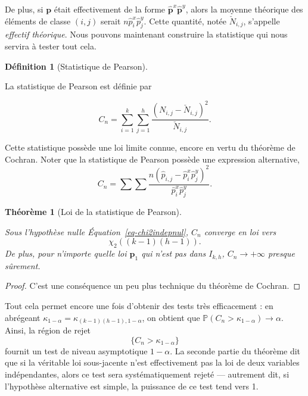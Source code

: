 \documentclass[
  10,
  letterpaper,
  DIV=11,
  numbers=noendperiod]{scrreport}
\theoremstyle{plain}
\newtheorem{theorem}{Théorème}[chapter]
\theoremstyle{definition}
\theoremstyle{plain}
\theoremstyle{definition}
\newtheorem{definition}{Définition}[chapter]
\theoremstyle{definition}
\theoremstyle{plain}
\theoremstyle{remark}
\begin{document}
De plus, si \(\mathbf{p}\) était effectivement de la forme
\(\hat{\mathbf{p}}^x\hat{\mathbf{p}}^y\), alors la moyenne théorique des
éléments de classe \((i,j)\) serait \(n\hat{p}^x_i \hat{p}^y_j\). Cette
quantité, notée \(\check{N}_{i,j}\), s'appelle \emph{effectif
théorique}. Nous pouvons maintenant construire la statistique qui nous
servira à tester tout cela.

\begin{definition}[Statistique de
Pearson]\protect\hypertarget{def-statpearson}{}\label{def-statpearson}

La statistique de Pearson est définie par

\[C_n = \sum_{i=1}^k \sum_{j=1}^h \frac{(N_{i,j} - \check{N}_{i,j})^2}{\check{N}_{i,j}}. \]

\end{definition}

Cette statistique possède une loi limite connue, encore en vertu du
théorème de Cochran. Noter que la statistique de Pearson possède une
expression alternative,
\[C_n = \sum\sum \frac{n(\hat{p}_{i,j} - \hat{p}^x_i \hat{p}^y_j)^2}{\hat{p}^x_i \hat{p}^y_j}.  \]

\begin{theorem}[Loi de la statistique de
Pearson]\protect\hypertarget{thm-testindepchi2}{}\label{thm-testindepchi2}

Sous l'hypothèse nulle Équation~\ref{eq-chi2indepnul}, \(C_n\) converge
en loi vers \[ \chi_2((k-1)(h-1)).\] De plus, pour n'importe quelle loi
\(\mathbf{p}_1\) qui n'est pas dans \(I_{k,h}\), \(C_n \to +\infty\)
presque sûrement.

\end{theorem}

\begin{proof}

C'est une conséquence un peu plus technique du théorème de Cochran.

\end{proof}

Tout cela permet encore une fois d'obtenir des tests très efficacement :
en abrégeant \(\kappa_{1 - \alpha} = \kappa_{(k-1)(h-1), 1-\alpha}\), on
obtient que \(\mathbb{P}(C_n > \kappa_{1-\alpha}) \to \alpha\). Ainsi,
la région de rejet \[\{C_n > \kappa_{1-\alpha}\} \] fournit un test de
niveau asymptotique \(1-\alpha\). La seconde partie du théorème dit que
si la véritable loi sous-jacente n'est effectivement pas la loi de deux
variables indépendantes, alors ce test sera systématiquement rejeté ---
autrement dit, si l'hypothèse alternative est simple, la puissance de ce
test tend vers 1.
\end{document}
